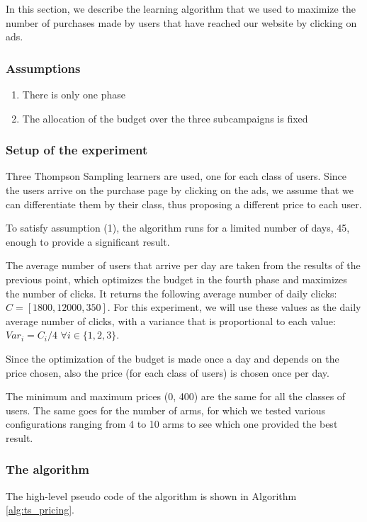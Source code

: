 \newcommand{\pluseq}{\mathrel{+}=}

In this section, we describe the learning algorithm that we used to maximize the number of purchases made by users that have reached our website by clicking on ads.

\subsubsection{Assumptions}
\begin{enumerate}
    \item There is only one phase
    \item The allocation of the budget over the three subcampaigns is fixed
\end{enumerate}

\subsubsection{Setup of the experiment}
Three Thompson Sampling learners are used, one for each class of users. Since the users arrive on the purchase page by clicking on the ads, we assume that we can differentiate them by their class, thus proposing a different price to each user.

To satisfy assumption (1), the algorithm runs for a limited number of days, 45, enough to provide a significant result.

The average number of users that arrive per day are taken from the results of the previous point, which optimizes the budget in the fourth phase and maximizes the number of clicks. It returns the following average number of daily clicks: $C=[1800, 12000, 350]$. For this experiment, we will use these values as the daily average number of clicks, with a variance that is proportional to each value: $Var_i = C_i / 4$ $\forall{i} \in \{1,2,3\}$.

Since the optimization of the budget is made once a day and depends on the price chosen, also the price (for each class of users) is chosen once per day.

The minimum and maximum prices (0, 400) are the same for all the classes of users. The same goes for the number of arms, for which we tested various configurations ranging from 4 to 10 arms to see which one provided the best result.

\subsubsection{The algorithm}
The high-level pseudo code of the algorithm is shown in Algorithm \ref{alg:ts_pricing}.

